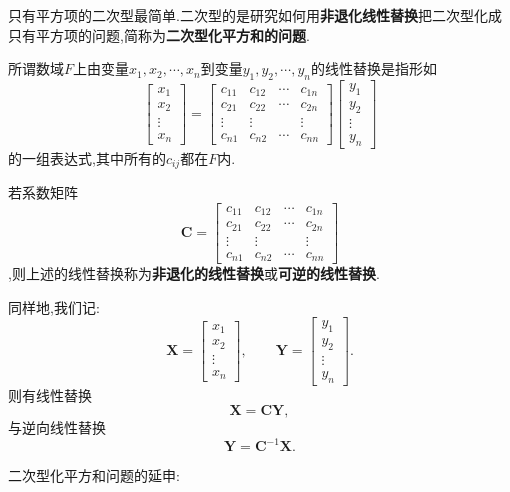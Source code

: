 \documentclass[9pt,a4paper]{book}
\begin{document}
只有平方项的二次型最简单.二次型的是研究如何用\textbf{非退化线性替换}把二次型化成只有平方项的问题,简称为\textbf{二次型化平方和的问题}.
\begin{defination}[非退化的线性替换的定义]
	所谓数域$ F $上由变量$x_1,x_2,\cdots,x_n $到变量$ y_1,y_2,\cdots,y_n $的线性替换是指形如\[ 
\begin{bmatrix}
x_1\\x_2\\\vdots\\x_n
\end{bmatrix}
=
\begin{bmatrix}
c_{11}&c_{12}&\cdots&c_{1n}\\
c_{21}&c_{22}&\cdots&c_{2n}\\
\vdots&\vdots& &\vdots\\
c_{n1}&c_{n2}&\cdots&c_{nn}
\end{bmatrix}
\begin{bmatrix}
y_1\\y_2\\\vdots\\y_n
\end{bmatrix}
					\]的一组表达式,其中所有的$ c_{ij} $都在$ F $内.

若系数矩阵\[ \bm{C}=\begin{bmatrix}
c_{11}&c_{12}&\cdots&c_{1n}\\
c_{21}&c_{22}&\cdots&c_{2n}\\
\vdots&\vdots& &\vdots\\
c_{n1}&c_{n2}&\cdots&c_{nn}
\end{bmatrix} \]
,则上述的线性替换称为\textbf{非退化的线性替换}或\textbf{可逆的线性替换}.

同样地,我们记:\[ \bm{X}=\begin{bmatrix}
	x_1\\x_2\\\vdots\\x_n
\end{bmatrix}, \qquad \bm{Y}=\begin{bmatrix}
y_1\\y_2\\\vdots\\y_n
\end{bmatrix}.
 \]则有线性替换\[ \bm{X}=\bm{CY} ,\]与逆向线性替换\[ \bm{Y}=\bm{C}^{-1}\bm{X} .\]
\end{defination}
二次型化平方和问题的延申:
\end{document}
